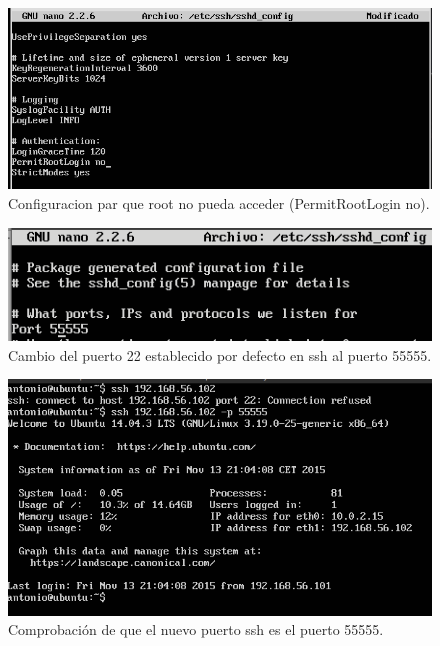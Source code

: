\begin{figure}[H]
    \begin{center}
        \includegraphics[scale=0.6]{imagenes/img5}
        \caption{Configuracion par que root no pueda acceder (PermitRootLogin no).}
        \label{fig5}
    \end{center}
\end{figure}

\begin{figure}[H]
    \begin{center}
        \includegraphics[scale=0.7]{imagenes/img7}
        \caption{Cambio del puerto 22 establecido por defecto en ssh al puerto 55555.}
        \label{fig6}
    \end{center}
\end{figure}

\begin{figure}[H]
    \begin{center}
        \includegraphics[scale=0.6]{imagenes/img6}
        \caption{Comprobación de que el nuevo puerto ssh es el puerto 55555.}
        \label{fig7}
    \end{center}
\end{figure}

